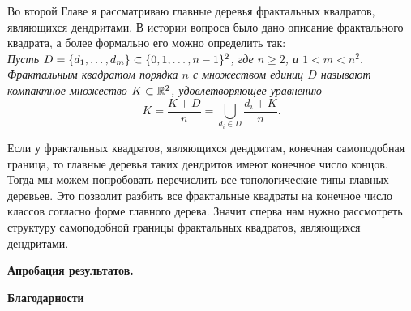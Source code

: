 Во второй Главе я рассматриваю главные деревья фрактальных квадратов, являющихся дендритами.
В истории вопроса было дано описание фрактального квадрата, а более формально его можно определить так:\\

{\em Пусть $D=\{d_1,\ldots,d_m\}\subset\{0,1,\ldots,n-1\}^2$, где $n\ge 2$, и $1<m<n^2$. 
{\em Фрактальным квадратом} порядка $n$ с {\em множеством единиц $D$} называют компактное множество $K\subset\mathbb{R}^2$, удовлетворяющее уравнению
$$K=\dfrac{K+D}{n}=\bigcup_{d_i\in D}\dfrac{d_i+K}{n}.$$}

Если у фрактальных квадратов, являющихся дендритам, конечная самоподобная граница, то главные деревья таких дендритов имеют конечное число концов.
Тогда мы можем попробовать перечислить все топологические типы главных деревьев.
Это позволит разбить все фрактальные квадраты на конечное число классов согласно форме главного дерева.
Значит сперва нам нужно рассмотреть структуру самоподобной границы фрактальных квадратов, являющихся дендритами.



%











\begin{center}
\textbf{Апробация результатов.}
\end{center}


\begin{center}
\textbf{Благодарности}
\end{center}




